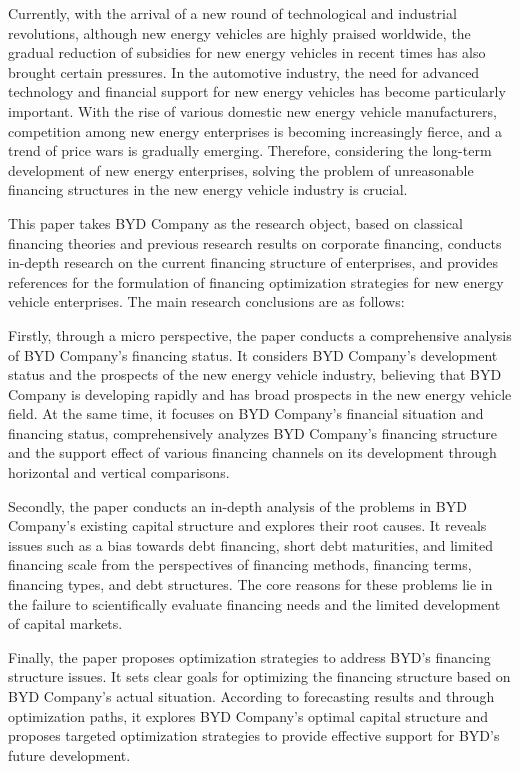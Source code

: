 \begin{abstract*}
Currently, with the arrival of a new round of technological and industrial revolutions, although new energy vehicles are highly praised worldwide, the gradual reduction of subsidies for new energy vehicles in recent times has also brought certain pressures. In the automotive industry, the need for advanced technology and financial support for new energy vehicles has become particularly important. With the rise of various domestic new energy vehicle manufacturers, competition among new energy enterprises is becoming increasingly fierce, and a trend of price wars is gradually emerging. Therefore, considering the long-term development of new energy enterprises, solving the problem of unreasonable financing structures in the new energy vehicle industry is crucial.

This paper takes BYD Company as the research object, based on classical financing theories and previous research results on corporate financing, conducts in-depth research on the current financing structure of enterprises, and provides references for the formulation of financing optimization strategies for new energy vehicle enterprises. The main research conclusions are as follows:

Firstly, through a micro perspective, the paper conducts a comprehensive analysis of BYD Company's financing status. It considers BYD Company's development status and the prospects of the new energy vehicle industry, believing that BYD Company is developing rapidly and has broad prospects in the new energy vehicle field. At the same time, it focuses on BYD Company's financial situation and financing status, comprehensively analyzes BYD Company's financing structure and the support effect of various financing channels on its development through horizontal and vertical comparisons.

Secondly, the paper conducts an in-depth analysis of the problems in BYD Company's existing capital structure and explores their root causes. It reveals issues such as a bias towards debt financing, short debt maturities, and limited financing scale from the perspectives of financing methods, financing terms, financing types, and debt structures. The core reasons for these problems lie in the failure to scientifically evaluate financing needs and the limited development of capital markets.

Finally, the paper proposes optimization strategies to address BYD's financing structure issues. It sets clear goals for optimizing the financing structure based on BYD Company's actual situation. According to forecasting results and through optimization paths, it explores BYD Company's optimal capital structure and proposes targeted optimization strategies to provide effective support for BYD's future development.
\end{abstract*}
